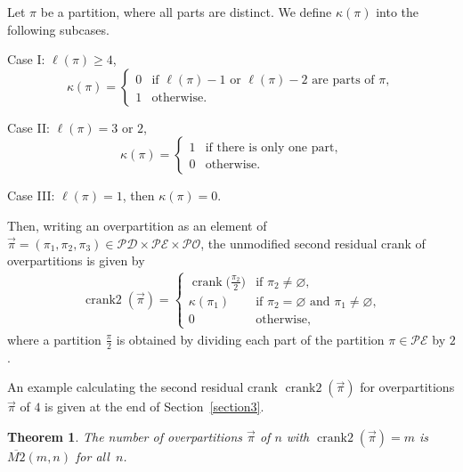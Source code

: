 \documentclass[10pt,a4paper]{amsart}
\numberwithin{equation}{section}
\newtheorem{Theorem}{Theorem}[section]
\newcommand\mylabel[1]{\label{#1}}
\begin{document}
\begin{Definition}
\mylabel{def:crank2}
Let $\pi$ be a partition, where all parts are distinct. We define $\kappa(\pi)$ into the following subcases.

Case I: $\ell(\pi) \geq 4$,
\begin{equation*}
\kappa(\pi)=\begin{cases}
0 & \mbox{if $\ell(\pi)-1$ or $\ell(\pi)-2$ are parts of $\pi$}, \\
1 & \mbox{otherwise.}
\end{cases}
\end{equation*}

Case II: $\ell(\pi) = 3$ or $2$,
\begin{equation*}
\kappa(\pi)=\begin{cases}
1 & \mbox{if there is only one part},
\\
0 & \mbox{otherwise.}
\end{cases}
\end{equation*}

Case III: $\ell(\pi) = 1$, then $\kappa(\pi)=0$.

Then, writing an overpartition as an element of $\vec{\pi}=(\pi_1,\pi_2,\pi_3) \in \mathcal{PD} \times \mathcal{PE} \times \mathcal{PO}$, the unmodified second residual crank of overpartitions is given by
\begin{align}
\mylabel{eq:crank2}
\operatorname{crank2}(\vec{\pi})=\begin{cases}
\operatorname{crank}\bigl(\frac{\pi_2}{2}\bigr) & \mbox{if $\pi_2 \neq \varnothing$},
\\
\kappa(\pi_1) & \mbox{if $\pi_2 = \varnothing$  and $\pi_1 \neq \varnothing$,}
\\
0 & \mbox{otherwise},
\end{cases}
\end{align}
where a partition $\frac{\pi}{2}$ is obtained by dividing each part of the partition $\pi \in \mathcal{PE}$ by $2$.
\end{Definition}
An example calculating the second residual crank $\operatorname{crank2}(\vec{\pi})$ for overpartitions $\vec{\pi}$ of $4$ is given at the end of Section~\ref{section3}.


\begin{Theorem}
\mylabel{thm:M2}
The number of overpartitions $\vec{\pi}$ of $n$ with $\operatorname{crank2}(\vec{\pi})=m$ is $\overline{M2}(m,n)$ for all~$n$.
\end{Theorem}
\end{document}

